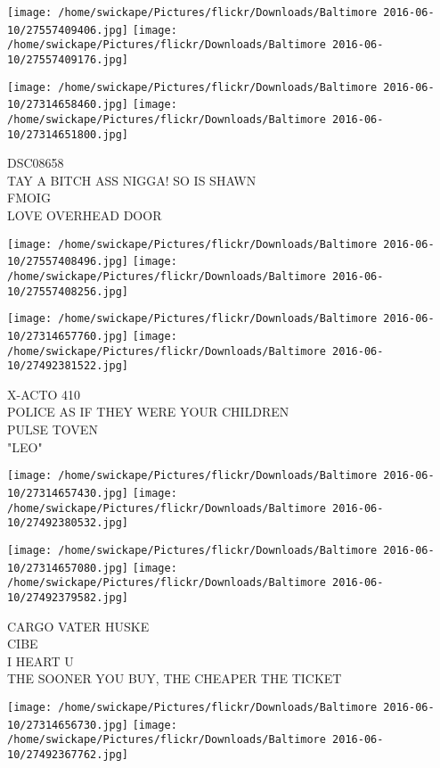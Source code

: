 \documentclass[10pt,letterpaper]{article}
\begin{document}
\texttt{[image: /home/swickape/Pictures/flickr/Downloads/Baltimore 2016-06-10/27557409406.jpg]}
\texttt{[image: /home/swickape/Pictures/flickr/Downloads/Baltimore 2016-06-10/27557409176.jpg]}

\texttt{[image: /home/swickape/Pictures/flickr/Downloads/Baltimore 2016-06-10/27314658460.jpg]}
\texttt{[image: /home/swickape/Pictures/flickr/Downloads/Baltimore 2016-06-10/27314651800.jpg]}

DSC08658\\
TAY A BITCH ASS NIGGA!  SO IS SHAWN\\
FMOIG\\
LOVE OVERHEAD DOOR\\
\pagebreak

\texttt{[image: /home/swickape/Pictures/flickr/Downloads/Baltimore 2016-06-10/27557408496.jpg]}
\texttt{[image: /home/swickape/Pictures/flickr/Downloads/Baltimore 2016-06-10/27557408256.jpg]}

\texttt{[image: /home/swickape/Pictures/flickr/Downloads/Baltimore 2016-06-10/27314657760.jpg]}
\texttt{[image: /home/swickape/Pictures/flickr/Downloads/Baltimore 2016-06-10/27492381522.jpg]}

X{-}ACTO 410\\
POLICE AS IF THEY WERE YOUR CHILDREN\\
PULSE TOVEN\\
"LEO"\\
\pagebreak

\texttt{[image: /home/swickape/Pictures/flickr/Downloads/Baltimore 2016-06-10/27314657430.jpg]}
\texttt{[image: /home/swickape/Pictures/flickr/Downloads/Baltimore 2016-06-10/27492380532.jpg]}

\texttt{[image: /home/swickape/Pictures/flickr/Downloads/Baltimore 2016-06-10/27314657080.jpg]}
\texttt{[image: /home/swickape/Pictures/flickr/Downloads/Baltimore 2016-06-10/27492379582.jpg]}

CARGO VATER HUSKE\\
CIBE\\
I HEART U\\
THE SOONER YOU BUY, THE CHEAPER THE TICKET\\
\pagebreak

\texttt{[image: /home/swickape/Pictures/flickr/Downloads/Baltimore 2016-06-10/27314656730.jpg]}
\texttt{[image: /home/swickape/Pictures/flickr/Downloads/Baltimore 2016-06-10/27492367762.jpg]}
\end{document}

